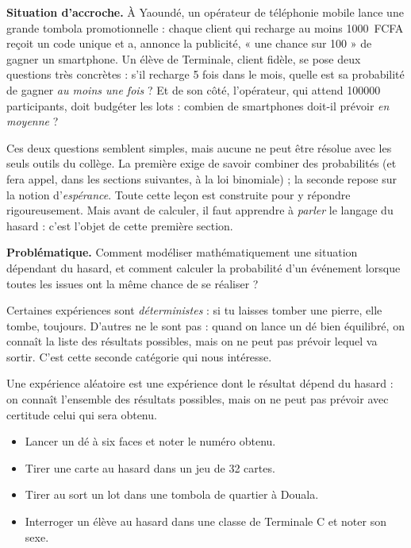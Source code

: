 \documentclass[11pt]{article}
\newcommand{\cle}[1]{{\popxbold\color{popdark}#1}}
\newcounter{popsec}
\newcounter{popsub}
\newcommand{\courssub}[1]{%
  \stepcounter{popsub}%
  \par\vspace{9pt}\noindent{\popxbold\fontsize{11.5}{13}\selectfont\color{popink}{\color{poporange}\thepopsec.\thepopsub}\hspace{6pt}#1}\par\nopagebreak\vspace{4pt}
}
\begin{document}
\textbf{Situation d'accroche.} À Yaoundé, un opérateur de téléphonie mobile lance une grande tombola promotionnelle : chaque client qui recharge au moins \SI{1000}{FCFA} reçoit un code unique et a, annonce la publicité, « une chance sur 100 » de gagner un smartphone. Un élève de Terminale, client fidèle, se pose deux questions très concrètes : s'il recharge 5 fois dans le mois, quelle est sa probabilité de gagner \emph{au moins une fois} ? Et de son côté, l'opérateur, qui attend \num{100000} participants, doit budgéter les lots : combien de smartphones doit-il prévoir \emph{en moyenne} ?

Ces deux questions semblent simples, mais aucune ne peut être résolue avec les seuls outils du collège. La première exige de savoir combiner des probabilités (et fera appel, dans les sections suivantes, à la loi binomiale) ; la seconde repose sur la notion d'\emph{espérance}. Toute cette leçon est construite pour y répondre rigoureusement. Mais avant de calculer, il faut apprendre à \emph{parler} le langage du hasard : c'est l'objet de cette première section.

\textbf{Problématique.} Comment modéliser mathématiquement une situation dépendant du hasard, et comment calculer la probabilité d'un événement lorsque toutes les issues ont la même chance de se réaliser ?

\courssub{Expérience aléatoire et univers}

Certaines expériences sont \emph{déterministes} : si tu laisses tomber une pierre, elle tombe, toujours. D'autres ne le sont pas : quand on lance un dé bien équilibré, on connaît la liste des résultats possibles, mais on ne peut pas prévoir lequel va sortir. C'est cette seconde catégorie qui nous intéresse.

\begin{definition}
Une \cle{expérience aléatoire} est une expérience dont le résultat dépend du hasard : on connaît l'ensemble des résultats possibles, mais on ne peut pas prévoir avec certitude celui qui sera obtenu.
\end{definition}

\begin{exemplebox}
\begin{itemize}
\item Lancer un dé à six faces et noter le numéro obtenu.
\item Tirer une carte au hasard dans un jeu de 32 cartes.
\item Tirer au sort un lot dans une tombola de quartier à Douala.
\item Interroger un élève au hasard dans une classe de Terminale C et noter son sexe.
\end{itemize}
\end{exemplebox}
\end{document}
